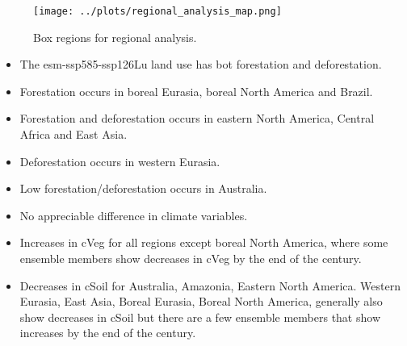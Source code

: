 \documentclass[]{article}
\begin{document}
\begin{figure}[H]
    \centering
    \texttt{[image: ../plots/regional\_analysis\_map.png]}
    \caption{Box regions for regional analysis.}
    \label{fig:box_regions}
\end{figure}

\begin{itemize}
    \item The esm-ssp585-ssp126Lu land use has bot forestation and deforestation.
    \item Forestation occurs in boreal Eurasia, boreal North America and Brazil.
    \item Forestation and deforestation occurs in eastern North America, Central Africa and East Asia.
    \item Deforestation occurs in western Eurasia.
    \item Low forestation/deforestation occurs in Australia.
    \item No appreciable difference in climate variables.
    \item Increases in cVeg for all regions except boreal North America, where some ensemble members show decreases in cVeg by the end of the century.
    \item Decreases in cSoil for Australia, Amazonia, Eastern North America. Western Eurasia, East Asia, Boreal Eurasia, Boreal North America, generally also show decreases in cSoil but there are a few ensemble members that show increases by the end of the century.
\end{itemize}
\end{document}

